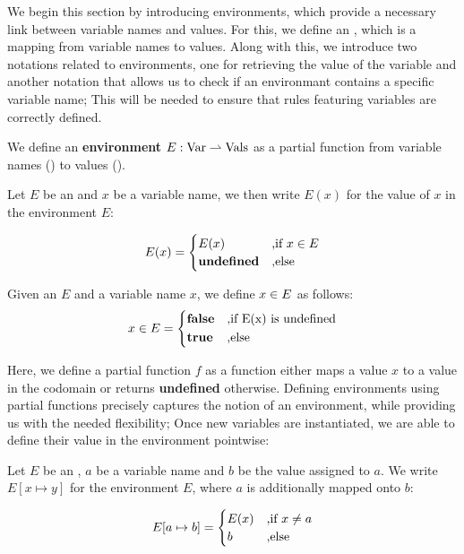 We begin this section by introducing environments, which provide a necessary link between variable names and values. For this, we define an , which is a mapping from variable names to values. Along with this, we introduce two notations related to environments, one for retrieving the value of the variable and another notation that allows us to check if an environmant contains a specific variable name; This will be needed to ensure that rules featuring variables are correctly defined.

\begin{definition}[Environment]\label{def:environment}
   We define an \textbf{environment} \(E: \text{\Var} \partialto \text{\Vals}\) as a partial function from variable names (\Var) to values (\Vals). 
\end{definition}

\begin{definition}\label{def:environment-getter}	
   Let \(E\) be an  and \(x\) be a variable name, we then write \(E(x)\) for the value of \(x\) in the environment \(E\):

   \[
      E(x) =
      \begin{cases}
	 E(x)		    & \mbox{,if } \contains{E}{x} \\
	 \textbf{undefined} &\mbox{,else}
      \end{cases}
   \]
\end{definition}

\begin{definition}\label{def:in-environment}
   Given an  \(E\) and a variable name \(x\), we define \(\contains{E}{x}\) as follows:
   \[
      \contains{E}{x} = 
      \begin{cases*}
	 \false & \mbox{,if E(x) is undefined}\\
	 \true & \mbox{,else} 
      \end{cases*}
   \]
\end{definition}

Here, we define a partial function \(f\) as a function either maps a value \(x\) to a value in the codomain or returns \textbf{undefined} otherwise. Defining environments using partial functions precisely captures the notion of an environment, while providing us with the needed flexibility; Once new variables are instantiated, we are able to define their value in the environment pointwise:

\begin{definition}\label{def:environment-augment}	
   Let \(E\) be an , \(a\) be a variable name and \(b\) be the value assigned to \(a\). We write \(E[x \mapsto y]\) for the environment \(E\), where \(a\) is additionally mapped onto \(b\):

   \[
      \envaugment{E}{a}{b} = 
      \begin{cases}
	 E(x)  & \mbox{,if } x \neq a\\
	 b     & \mbox{,else } 
      \end{cases}
   \]

\end{definition}

